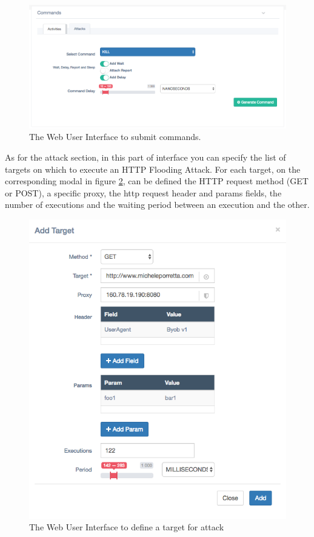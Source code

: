 \begin{figure}[tp]
  \centering
  \includegraphics[scale=0.45]{./fig/commandsWUI.png}
  \caption{The Web User Interface to submit commands.}
    \label{fig:commands-wui}
\end{figure}

As for the attack section, in this part of interface you can specify the list of targets on which to execute an HTTP Flooding Attack. For each target, on the corresponding modal in figure \ref{fig:target-wui}, can be defined the HTTP request method (GET or POST), a specific proxy, the http request header and params fields, the number of executions and the waiting period between an execution and the other.

\begin{figure}[tp]
  \centering
  \includegraphics[scale=0.45]{./fig/targetWUI.png}
  \caption{The Web User Interface to define a target for attack}
    \label{fig:target-wui}
\end{figure}

